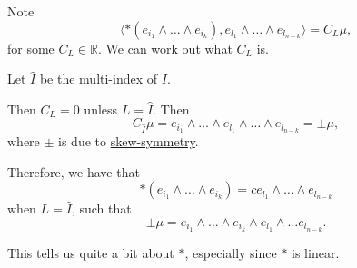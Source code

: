 \documentclass[notoc,notitlepage]{tufte-book}
\begin{document}
Note 
\begin{equation*}
  \langle * (e_{i_1} \land \hdots \land e_{i_k}), e_{l_1} \land
  \hdots \land e_{l_{n-k}} \rangle = C_L \mu,
\end{equation*}
for some $C_L \in \mathbb{R}$. We can work out what $C_L$ is.

Let $\hat{I}$ be the   multi-index of $I$.

Then $C_L = 0$ unless $L = \hat{I}$. Then
\begin{equation*}
  C_{\hat{I}} \mu = e_{i_1} \land \hdots \land e_{l_1} \land \hdots \land
  e_{l_{n-k}} = \pm \mu,
\end{equation*}
where $\pm$ is due to \hyperref[defn:_k_form]{skew-symmetry}.

Therefore, we have that
\begin{equation*}
  *(e_{i_1} \land \hdots \land e_{i_k}) = c e_{l_1} \land \hdots \land
  e_{l_{n-k}}
\end{equation*}
when $L = \hat{I}$, such that
\begin{equation*}\label{eq:}
  \pm \mu = e_{i_1} \land \hdots \land e_{i_k} \land e_{l_1} \land \hdots
  e_{l_{n-k}}.
\end{equation*}

\begin{note}
  This tells us quite a bit about $*$, especially since $*$ is linear.
\end{note}
\end{document}
